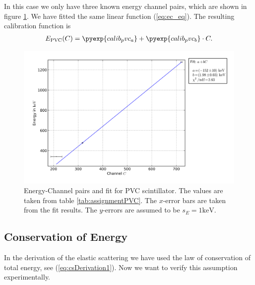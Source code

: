 In this case we only have three known energy channel pairs, which are shown
in figure \ref{fig:calibPVC}.  We have fitted the same linear function
(\ref{eq:ec_eq}). The resulting calibration function is
\begin{align}
  E_{\mathrm{PVC}}(C) = \pyexp{calib_pvc_a} + \pyexp{calib_pvc_b} \cdot C.
  \label{eq:calib_pvc}
\end{align}

\begin{figure}[tbp]
  \centering
  \includegraphics[width=1.0\textwidth]{plots/calib_pvc.png}
  \caption{Energy-Channel pairs and fit for PVC scintillator. The values are
  taken from table \ref{tab:assignmentPVC}. The $x$-error bars are taken
  from the fit results.  The $y$-errors are assumed to be $s_E =
  1\mathrm{keV}$.}
   \label{fig:calibPVC}
\end{figure}


\FloatBarrier
\subsection{Conservation of Energy}
In the derivation of the elastic \compton scattering we have used the law of
conservation of total energy, see (\ref{eq:csDerivation1}). Now we want to
verify this assumption experimentally.

